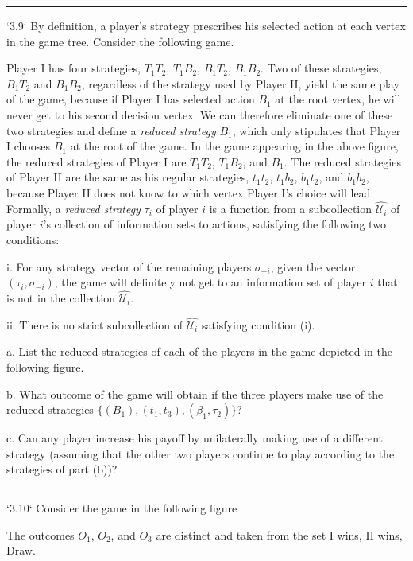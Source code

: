 \documentclass[10pt]{report}
\begin{document}
\vspace{0.5cm}
\hrule
\vspace{0.5cm}
`3.9` By definition, a player's strategy prescribes his selected action at each vertex in the game tree. Consider the following game.

Player I has four strategies, $T_{1}T_{2}$, $T_{1}B_{2}$, $B_{1}T_{2}$, $B_{1}B_{2}$. Two of these strategies, $B_{1}T_{2}$ and $B_{1}B_{2}$, regardless of the strategy used by Player II, yield the same play of the game, because if Player I has selected action $B_{1}$ at the root vertex, he will never get to his second decision vertex. We can therefore eliminate one of these two strategies and define a \textit{reduced strategy} $B_{1}$, which only stipulates that Player I chooses $B_{1}$ at the root of the game. In the game appearing in the above figure, the reduced strategies of Player I are $T_{1}T_{2}$, $T_{1}B_{2}$, and $B_{1}$. The reduced strategies of Player II are the same as his regular strategies, $t_{1}t_{2}$, $t_{1}b_{2}$, $b_{1}t_{2}$, and $b_{1}b_{2}$, because Player II does not know to which vertex Player I's choice will lead. Formally, a \textit{reduced strategy} $\tau_{i}$ of player $i$ is a function from a subcollection $\widehat{\mathcal{U}_{i}}$ of player $i$'s collection of information sets to actions, satisfying the following two conditions:

i. For any strategy vector of the remaining players $\sigma_{-i}$, given the vector $(\tau_{i},\sigma_{-i})$, the game will definitely not get to an information set of player $i$ that is not in the collection $\widehat{\mathcal{U}_{i}}$.

ii. There is no strict subcollection of $\widehat{\mathcal{U}_{i}}$ satisfying condition (i).

a. List the reduced strategies of each of the players in the game depicted in the following figure.

b. What outcome of the game will obtain if the three players make use of the reduced strategies $\{(B_{1}),(t_{1},t_{3}),(\beta_{1},\tau_{2})\}$?

c. Can any player increase his payoff by unilaterally making use of a different strategy (assuming that the other two players continue to play according to the strategies of part (b))?

\vspace{0.5cm}
\hrule
\vspace{0.5cm}
`3.10` Consider the game in the following figure

The outcomes $O_{1}$, $O_{2}$, and $O_{3}$ are distinct and taken from the set {I wins, II wins, Draw}.
\end{document}
